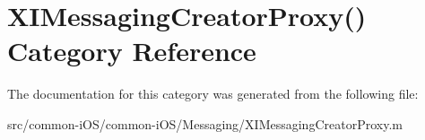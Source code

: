 \hypertarget{category_x_i_messaging_creator_proxy_07_08}{}\section{X\+I\+Messaging\+Creator\+Proxy() Category Reference}
\label{category_x_i_messaging_creator_proxy_07_08}


The documentation for this category was generated from the following file\+:\begin{DoxyCompactItemize}
\item 
src/common-\/i\+O\+S/common-\/i\+O\+S/\+Messaging/X\+I\+Messaging\+Creator\+Proxy.\+m\end{DoxyCompactItemize}
